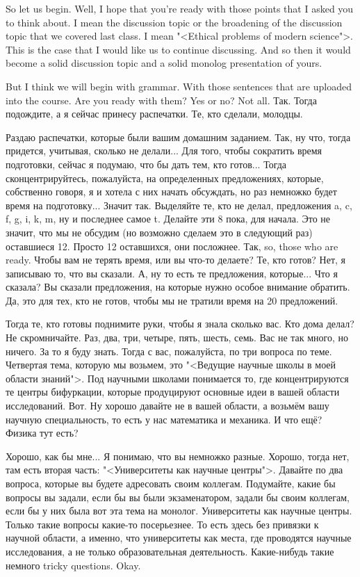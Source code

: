 \documentclass[main.tex]{subfiles}
\begin{document}

So let us begin.
Well, I hope that you're ready with those points that I asked you to think about.
I mean the discussion topic or the broadening of the discussion topic that we covered last class.
I mean "<Ethical problems of modern science">.
This is the case that I would like us to continue discussing.
And so then it would become a solid discussion topic and a solid monolog presentation of yours.

But I think we will begin with grammar.
With those sentences that are uploaded into the course.
Are you ready with them?
Yes or no?
Not all.
Так. Тогда подождите, а я сейчас принесу распечатки.
Те, кто сделали, молодцы.

Раздаю распечатки, которые были вашим домашним заданием.
Так, ну что, тогда придется, учитывая, сколько не делали...
Для того, чтобы сократить время подготовки, сейчас я подумаю, что бы дать тем, кто готов...
Тогда сконцентрируйтесь, пожалуйста, на определенных предложениях, которые, собственно говоря, я и хотела с них начать обсуждать, но раз немножко будет время на подготовку...
Значит так.
Выделяйте те, кто не делал, предложения a, c, f, g, i, k, m, ну и последнее самое t.
Делайте эти 8 пока, для начала.
Это не значит, что мы не обсудим (но возможно сделаем это в следующий раз) оставшиеся 12.
Просто 12 оставшихся, они посложнее.
Так, so, those who are ready.
Чтобы вам не терять время, или вы что-то делаете?
Те, кто готов?
Нет, я записываю то, что вы сказали.
А, ну то есть те предложения, которые...
Что я сказала?
Вы сказали предложения, на которые нужно особое внимание обратить.
Да, это для тех, кто не готов, чтобы мы не тратили время на 20 предложений.

Тогда те, кто готовы поднимите руки, чтобы я знала сколько вас.
Кто дома делал?
Не скромничайте.
Раз, два, три, четыре, пять, шесть, семь.
Вас не так много, но ничего.
За то я буду знать.
Тогда с вас, пожалуйста, по три вопроса по теме.
Четвертая тема, которую мы возьмем, это "<Ведущие научные школы в моей области знаний">.
Под научными школами понимается то, где концентрируются те центры бифуркации, которые продуцируют основные идеи в вашей области исследований.
Вот.
Ну хорошо давайте не в вашей области, а возьмём вашу научную специальность, то есть у нас математика и механика.
И что ещё?
Физика тут есть?

Хорошо, как бы мне...
Я понимаю, что вы немножко разные.
Хорошо, тогда нет, там есть вторая часть: "<Университеты как научные центры">.
Давайте по два вопроса, которые вы будете адресовать своим коллегам.
Подумайте, какие бы вопросы вы задали, если бы вы были экзаменатором, задали бы своим коллегам, если бы у них была вот эта тема на монолог.
Университеты как научные центры.
Только такие вопросы какие-то посерьезнее.
То есть здесь без привязки к научной области, а именно, что университеты как места, где проводятся научные исследования, а не только образовательная деятельность.
Какие-нибудь такие немного tricky questions.
Okay.
\end{document}
